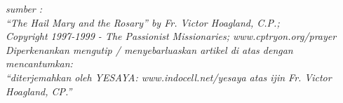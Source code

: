\scriptsize
\begin{flushleft}
\textit{sumber : \\
``The Hail Mary and the Rosary'' by Fr. Victor Hoagland, C.P.; \\
Copyright 1997-1999 - The Passionist Missionaries; www.cptryon.org/prayer
\\
Diperkenankan mengutip / menyebarluaskan artikel di atas dengan mencantumkan:\\ ``diterjemahkan oleh YESAYA: www.indocell.net/yesaya atas ijin Fr. Victor Hoagland, CP.''}
\end{flushleft}
\normalsize